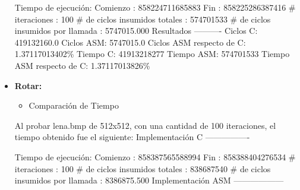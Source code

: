 \documentclass[10pt, a4paper]{article}
\begin{document}
\begin{itemize}
Tiempo de ejecución:\newline
  Comienzo                          : 858224711685883\newline
  Fin                               : 858225286387416\newline
  \# iteraciones                     : 100\newline
  \# de ciclos insumidos totales     : 574701533\newline
  \# de ciclos insumidos por llamada : 5747015.000\newline
\newline
Resultados\newline
----------\newline
Ciclos C:                 419132160.0\newline
Ciclos ASM:               5747015.0\newline
Ciclos ASM respecto de C: 1.37117013402\%\newline
Tiempo C:                 41913218277\newline
Tiempo ASM:               574701533\newline
Tiempo ASM respecto de C: 1.37117013826\%\newline

\item {\textbf{Rotar:}} 

\begin{itemize}
\item{Comparación de Tiempo}
\end{itemize}
Al probar lena.bmp de 512x512, con una cantidad de 100 iteraciones, el tiempo obtenido fue el siguiente:\newline
Implementación C\newline
----------------\newline

Tiempo de ejecución:\newline
  Comienzo                          : 858387565588994\newline
  Fin                               : 858388404276534\newline
  \# iteraciones                     : 100\newline
  \# de ciclos insumidos totales     : 838687540\newline
  \# de ciclos insumidos por llamada : 8386875.500\newline
\newline
Implementación ASM\newline
------------------\newline


\end{itemize}
\end{document}
